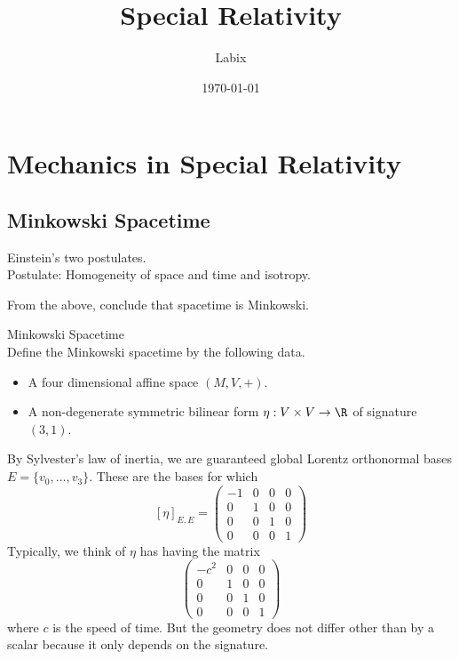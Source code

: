 \documentclass[a4paper]{article}
\title{Special Relativity}
\author{Labix}
\date{\today}
\begin{document}
\maketitle
\pagebreak
\tableofcontents

\pagebreak
\section{Mechanics in Special Relativity}
\subsection{Minkowski Spacetime}
Einstein's two postulates. \\
Postulate: Homogeneity of space and time and isotropy. 

From the above, conclude that spacetime is Minkowski. 

\begin{defn}{Minkowski Spacetime}{}\\
Define the Minkowski spacetime by the following data. 
\begin{itemize}
\item A four dimensional affine space $(M,V,+)$. 
\item A non-degenerate symmetric bilinear form $\eta:V\times V\to\R$ of signature $(3,1)$. 
\end{itemize}
\end{defn}

By Sylvester's law of inertia, we are guaranteed global Lorentz orthonormal bases $E=\{v_0,\dots,v_3\}$. These are the bases for which $$[\eta]_{E,E}=\begin{pmatrix}
-1 & 0 & 0 & 0\\
0 & 1 & 0 & 0\\
0 & 0 & 1 & 0\\
0 & 0 & 0 & 1
\end{pmatrix}$$ Typically, we think of $\eta$ has having the matrix $$\begin{pmatrix}
-c^2 & 0 & 0 & 0\\
0 & 1 & 0 & 0\\
0 & 0 & 1 & 0\\
0 & 0 & 0 & 1
\end{pmatrix}$$ where $c$ is the speed of time. But the geometry does not differ other than by a scalar because it only depends on the signature. \\
\end{document}
